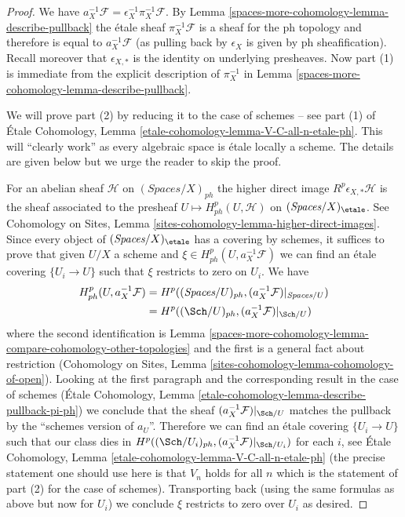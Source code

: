 \begin{proof}
We have $a_X^{-1}\mathcal{F} = \epsilon_X^{-1} \pi_X^{-1}\mathcal{F}$.
By Lemma \ref{spaces-more-cohomology-lemma-describe-pullback} the \'etale sheaf
$\pi_X^{-1}\mathcal{F}$ is a sheaf for the ph topology
and therefore is equal to $a_X^{-1}\mathcal{F}$ (as pulling
back by $\epsilon_X$ is given by ph sheafification).
Recall moreover that $\epsilon_{X, *}$ is the identity
on underlying presheaves.
Now part (1) is immediate from the explicit description of $\pi_X^{-1}$
in Lemma \ref{spaces-more-cohomology-lemma-describe-pullback}.

\medskip\noindent
We will prove part (2) by reducing it to the case of schemes --
see part (1) of
\'Etale Cohomology, Lemma \ref{etale-cohomology-lemma-V-C-all-n-etale-ph}.
This will ``clearly work'' as every algebraic space is
\'etale locally a scheme. The details are given below but we urge
the reader to skip the proof.

\medskip\noindent
For an abelian sheaf $\mathcal{H}$ on $(\textit{Spaces}/X)_{ph}$ the
higher direct image $R^p\epsilon_{X, *}\mathcal{H}$ is the sheaf
associated to the presheaf $U \mapsto H^p_{ph}(U, \mathcal{H})$
on $(\textit{Spaces}/X)_\etale$. See
Cohomology on Sites, Lemma \ref{sites-cohomology-lemma-higher-direct-images}.
Since every object of $(\textit{Spaces}/X)_\etale$ has a covering
by schemes, it suffices to prove that given $U/X$ a scheme and
$\xi \in H^p_{ph}(U, a_X^{-1}\mathcal{F})$ we can find
an \'etale covering $\{U_i \to U\}$ such that $\xi$
restricts to zero on $U_i$. We have
\begin{align*}
H^p_{ph}(U, a_X^{-1}\mathcal{F})
& =
H^p((\textit{Spaces}/U)_{ph}, (a_X^{-1}\mathcal{F})|_{\textit{Spaces}/U}) \\
& =
H^p((\Sch/U)_{ph}, (a_X^{-1}\mathcal{F})|_{\Sch/U})
\end{align*}
where the second identification is
Lemma \ref{spaces-more-cohomology-lemma-compare-cohomology-other-topologies}
and the first is a general fact about restriction
(Cohomology on Sites, Lemma \ref{sites-cohomology-lemma-cohomology-of-open}).
Looking at the first paragraph and the corresponding result in the
case of schemes (\'Etale Cohomology, Lemma
\ref{etale-cohomology-lemma-describe-pullback-pi-ph})
we conclude that the sheaf $(a_X^{-1}\mathcal{F})|_{\Sch/U}$
matches the pullback by the ``schemes version of $a_U$''.
Therefore we can find an \'etale covering
$\{U_i \to U\}$ such that our class dies in
$H^p((\Sch/U_i)_{ph}, (a_X^{-1}\mathcal{F})|_{\Sch/U_i})$
for each $i$, see
\'Etale Cohomology, Lemma \ref{etale-cohomology-lemma-V-C-all-n-etale-ph}
(the precise statement one should use here is that $V_n$ holds for all $n$
which is the statement of part (2) for the case of schemes).
Transporting back (using the same formulas as above but now for
$U_i$) we conclude $\xi$ restricts to zero over $U_i$ as desired.
\end{proof}

